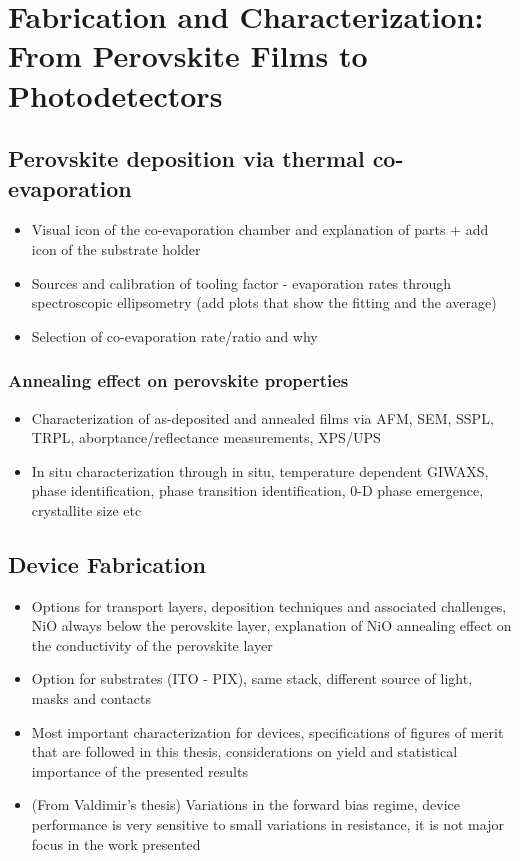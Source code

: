 \chapter{Fabrication and Characterization: From Perovskite Films to Photodetectors}\label{ch:material_properties}


\section{Perovskite deposition via thermal co-evaporation}

\begin{itemize}
    \item Visual icon of the co-evaporation chamber and explanation of parts + add icon of the substrate holder
    \item Sources and calibration of tooling factor - evaporation rates through spectroscopic ellipsometry (add plots that show the fitting and the average)
    \item Selection of co-evaporation rate/ratio and why
\end{itemize}

\subsection{Annealing effect on perovskite properties}

\begin{itemize}
    \item Characterization of as-deposited and annealed films via AFM, SEM, SSPL, TRPL, aborptance/reflectance measurements, XPS/UPS
    \item In situ characterization through in situ, temperature dependent GIWAXS, phase identification, phase transition identification, 0-D phase emergence, crystallite size etc
\end{itemize}

\section{Device Fabrication}

\begin{itemize}
    \item Options for transport layers, deposition techniques and associated challenges, NiO always below the perovskite layer, explanation of NiO annealing effect on the conductivity of the perovskite layer
    \item Option for substrates (ITO - PIX), same stack, different source of light, masks and contacts
    \item Most important characterization for devices, specifications of figures of merit that are followed in this thesis, considerations on yield and statistical importance of the presented results
    \item (From Valdimir's thesis) Variations in the forward bias regime, device performance is very sensitive to small variations in resistance, it is not major focus in the work presented
\end{itemize}

